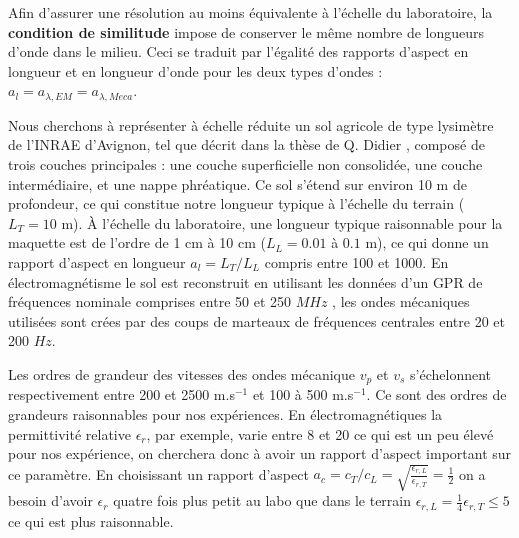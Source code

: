 Afin d'assurer une résolution au moins équivalente à l'échelle du laboratoire, la \textbf{condition de similitude} impose de conserver le même nombre de longueurs d'onde dans le milieu. Ceci se traduit par l'égalité des rapports d'aspect en longueur et en longueur d'onde pour les deux types d'ondes : $a_l = a_{\lambda,EM} = a_{\lambda,Meca}$.


Nous cherchons à représenter à échelle réduite un sol agricole de type lysimètre de l'INRAE d'Avignon, tel que décrit dans la thèse de Q. Didier \cite{didie2024}, composé de trois couches principales : une couche superficielle non consolidée, une couche intermédiaire, et une nappe phréatique. Ce sol s’étend sur environ 10 m de profondeur, ce qui constitue notre longueur typique à l’échelle du terrain ($L_T = 10$ m). À l’échelle du laboratoire, une longueur typique raisonnable pour la maquette est de l’ordre de 1 cm à 10 cm ($L_L = 0.01$ à $0.1$ m), ce qui donne un rapport d’aspect en longueur $a_l = L_T / L_L$ compris entre 100 et 1000. En électromagnétisme le sol est reconstruit en utilisant les données d'un GPR de fréquences nominale comprises entre 50 et 250 $MHz$ \cite{pulseekko}, les ondes mécaniques utilisées sont crées par des coups de marteaux de fréquences centrales entre 20 et 200 $Hz$. \par 



Les ordres de grandeur des vitesses des ondes mécanique $v_p$ et $v_s$ s’échelonnent respectivement entre 200 et 2500 m.s$^{-1}$ et 100 à 500 m.s$^{-1}$. Ce sont des ordres de grandeurs raisonnables pour nos expériences. En électromagnétiques la permittivité relative $\epsilon_r$, par exemple, varie entre 8 et 20 ce qui est un peu élevé pour nos expérience, on cherchera donc à avoir un rapport d'aspect important sur ce paramètre. En choisissant un rapport d'aspect $a_c = c_T/c_L = \sqrt{\frac{\epsilon_{r,L}}{\epsilon_{r,T}}} = \frac{1}{2} $ on a besoin d'avoir $\epsilon_r$ quatre fois plus petit au labo que dans le terrain $\epsilon_{r,L} = \frac{1}{4} \epsilon_{r,T} \leq 5 $ ce qui est plus raisonnable.\par


